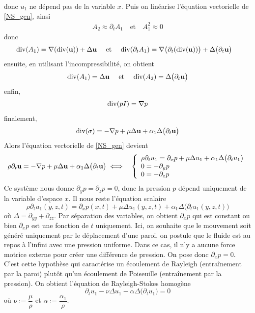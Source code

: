 donc $u_1$ ne dépend pas de la variable $x$. Puis on linéarise l'équation vectorielle de \eqref{NS_gen}, ainsi
\begin{eqnarray*}
    A_2 \approx \partial_t A_1 \ \ \ \text{ et } \ \ \ A_1^2 \approx 0
\end{eqnarray*}
donc 
\begin{align*}
    \mathrm{div}(A_1) &= \nabla(\mathrm{div}(\bm{\mathrm{u}})) + \Delta \bm{\mathrm{u}} &\text{ et }&& \mathrm{div}(\partial_tA_1) &=\nabla\big(\partial_t(\mathrm{div}(\bm{\mathrm{u}}))\big) + \Delta\big(\partial_t \bm{\mathrm{u}}\big)
\end{align*}
ensuite, en utilisant l'incompressibilité, on obtient 
\begin{eqnarray*}
    \mathrm{div}(A_1) = \Delta \bm{\mathrm{u}} \ \ \ \text{ et } \ \ \ \mathrm{div}(A_2) = \Delta\big(\partial_t \bm{\mathrm{u}}\big)
\end{eqnarray*}
enfin,
\begin{equation*}
    \mathrm{div}(pI) = \nabla p
\end{equation*}
finalement,  
\begin{equation*}
    \mathrm{div}(\sigma) = -\nabla p +\mu \Delta \bm{\mathrm{u}} + \alpha_1 \Delta\big(\partial_t \bm{\mathrm{u}} \big)
\end{equation*}
Alors l'équation vectorielle de \eqref{NS_gen} devient
\begin{eqnarray*}
    \rho \partial_t \bm{\mathrm{u}} = -\nabla p + \mu \Delta \bm{\mathrm{u}} + \alpha_1 \Delta\big(\partial_t\bm{\mathrm{u}}\big)
    &\iff& \left\{\begin{array}{l}
        \rho \partial_t u_1 = \partial_xp + \mu\Delta u_1 + \alpha_1 \Delta \big(\partial_t u_1\big) \\
        0 = -\partial_y p \\
        0 = - \partial_z p
    \end{array}\right.
\end{eqnarray*}
Ce système nous donne $\partial_y p = \partial_z p =0$, donc la pression $p$ dépend uniquement de la variable d'espace $x$. Il nous reste l'équation scalaire
\begin{equation*}
    \rho \partial_t u_1(y,z,t) = \partial_xp(x,t) + \mu\Delta u_1(y,z,t) + \alpha_1 \Delta \big(\partial_t u_1(y,z,t)\big)
\end{equation*}
où $\Delta = \partial_{yy}+\partial_{zz}$. Par séparation des variables, on obtient $\partial_xp$ qui est constant ou bien $\partial_xp$ est une fonction de $t$ uniquement. Ici, on souhaite que le mouvement soit généré uniquement par le déplacement d'une paroi, on postule que le fluide est au repos à l'infini avec une pression uniforme. Dans ce cas, il n'y a aucune force motrice externe pour créer une différence de pression. On pose donc $\partial_xp=0$. C'est cette hypothèse qui caractérise un écoulement de Rayleigh (entraînement par la paroi) plutôt qu'un écoulement de Poiseuille (entraînement par la pression). On obtient l'équation de Rayleigh-Stokes homogène
\begin{equation*}\label{eq_RS_scalaire}
    \partial_t u_1 - \nu \Delta u_1 - \alpha \Delta \big(\partial_t u_1\big)=0
\end{equation*}
où $\nu := \dfrac{\mu}{\rho}$ et $\alpha := \dfrac{\alpha_1}{\rho}$.

